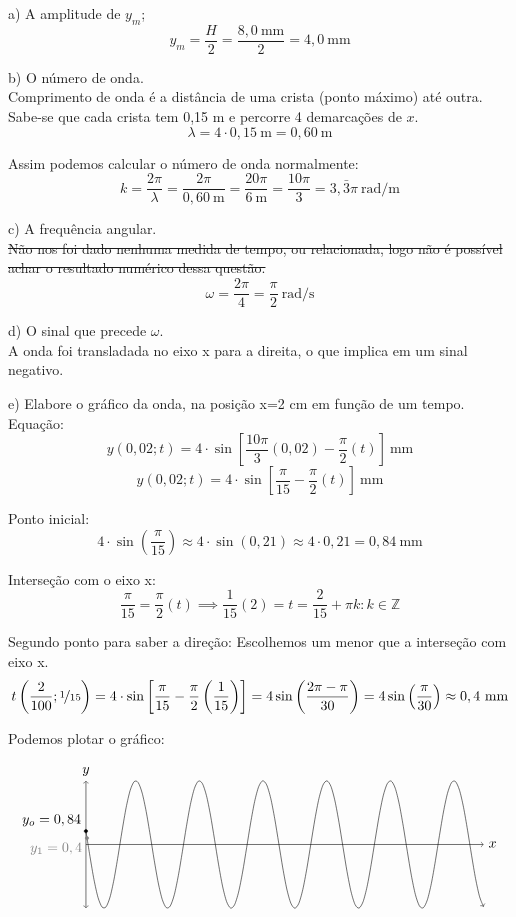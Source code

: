 \documentclass[12pt,a4paper]{article}
\begin{document}
  a) A amplitude de $y_m$;
  \[
        y_m = \frac{H}{2} = \frac{8,0\ \text{mm}}{2} = 4,0\ \text{mm}
  \]

  b) O número de onda. \\
  Comprimento de onda é a distância de uma crista (ponto máximo) até outra.
  Sabe-se que cada crista tem 0,15 m e percorre 4 demarcações de $x$.
  \[
    \lambda = 4 \cdot 0,15\ \text{m} = 0,60\ \text{m}
  \]

  Assim podemos calcular o número de onda normalmente:
  \[
    k = \frac{2\pi}{\lambda} = \frac{2\pi}{0,60\ \text{m}} = 
    \frac{20\pi}{6\ \text{m}} = \frac{10\pi}{3} = 3,\bar{3}\pi\ \text{rad/m}
  \]

  c) A frequência angular. \\
  \st{Não nos foi dado nenhuma medida de tempo, ou relacionada, logo não é possível achar o resultado
  numérico dessa questão.}
  \[
    \omega = \frac{2\pi}{4} = \frac{\pi }{2}\ \text{rad/s}
  \]

  \vspace*{.5cm}

  d) O sinal que precede $\omega$.\\
  A onda foi transladada no eixo x para a direita, o que implica em um sinal negativo.
  \vspace*{.5cm}

  e) Elabore o gráfico da onda, na posição x=2 cm em função de um tempo. \\
  Equação: 
  \[
    y(0,02;t) = 4\cdot \sin\left[\frac{10\pi}{3}(0,02) - \frac{\pi}{2}(t)\right] \ \text{mm}
  \]
  \[
    y(0,02;t) = 4\cdot \sin\left[\frac{\pi}{15} - \frac{\pi}{2}(t)\right] \ \text{mm}
  \]

  Ponto inicial: 
  \[
    4\cdot \sin \left( \frac{\pi}{15} \right) \approx 4\cdot \sin (0,21) 
    \approx 4\cdot0,21 = 0,84\ \text{mm}
  \]

  Interseção com o eixo x:
  \[
    \frac{\pi}{15} = \frac{\pi}{2} (t) \implies \frac{1}{15}(2) = t = \frac{2}{15} + \pi k : k \in \mathbb{Z}
  \]

  Segundo ponto para saber a direção: Escolhemos um menor que a interseção com eixo x.
  \[
    t\left(\frac{2}{100};\nicefrac{1}{15}\right) = 4 \cdot \sin \left[\frac{\pi}{15} - \frac{\pi}{2}
    \left( \frac{1}{15} \right)\right] = 4 \sin \left(\frac{2\pi - \pi}{30}\right)
    = 4\sin\left(\frac{\pi}{30}\right) \approx 0,4\ \text{mm}
  \]

  Podemos plotar o gráfico:

  \[
    \begin{tikzpicture}[scale=.4,domain=0:25]
      \draw[<->] (0,-4) -- (0,4) node[anchor=south] {$y$};
      \draw[->] (0,0) -- (25,0) node[anchor=west] {$x$};

      \draw[->] plot[samples=100,smooth]({\x},{ 4 * sin( (pi/15 - (\x * pi)/2) r)});
      
      \draw[fill] (0,0.84) circle (3pt) node[anchor=south east]{$y_o = 0,84$};
      \draw[fill,gray] (0.067,0.4) circle (3pt) node[anchor=north east]{$y_1 = 0,4$};
    \end{tikzpicture}
  \]
  \newpage
\end{document}
